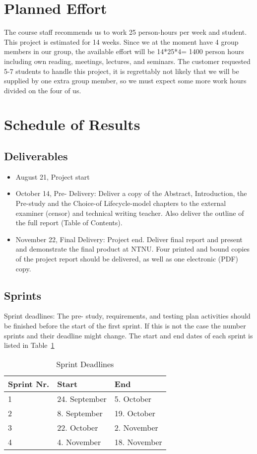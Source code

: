 \section{Planned Effort}
The course staff recommends us to work 25 person-hours per week and student. This project is estimated for 14 weeks. Since we at the moment have 4 group members in our group, the available effort will be 14*25*4= 1400 person hours including own reading, meetings, lectures, and seminars. The customer requested 5-7 students to handle this project, it is regrettably not likely that we will be supplied by one extra group member, so we must expect some more work hours divided on the four of us.

\section{Schedule of Results}
\subsection {Deliverables}

\begin {itemize}

\item August 21, Project start

\item October 14, Pre- Delivery: Deliver a copy of the Abstract, Introduction, the Pre-study and the Choice-of Lifecycle-model chapters to the external examiner (censor) and technical writing teacher. Also deliver the outline of the full report (Table of  Contents).

\item November 22, Final Delivery: Project end. Deliver final report and present and demonstrate the final product at NTNU. Four printed and bound copies of  the project report should be delivered, as well as one electronic (PDF) copy.

\end {itemize}

\subsection {Sprints}

Sprint deadlines:
The pre- study, requirements, and testing plan activities should be finished before the start of the first sprint. If this is not the case the number sprints and their deadline might change. The start and end dates of each sprint is listed in Table~\ref{table:sprintdeadlines}

\begin{table}
\caption{Sprint Deadlines}
\centering
\begin{tabular}{ l l l }
\hline
Sprint Nr.		&Start		&End		\\
\hline
1		&24. September		&5. October		\\
2		&8. September			&19. October		\\
3		&22. October			&2. November		\\
4		&4. November			&18. November	\\
\hline
\end{tabular}
\label{table:sprintdeadlines}
\end{table}
